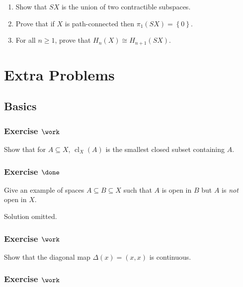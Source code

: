 \begin{enumerate}
\def\labelenumi{\alph{enumi}.}
\item
  Show that \(SX\) is the union of two contractible subspaces.
\item
  Prove that if \(X\) is path-connected then
  \(\pi_1 (SX) = \left\{{0}\right\}\).
\item
  For all \(n \geq 1\), prove that \(H_{n} (X) \cong H_{n+1} (SX)\).
\end{enumerate}

\hypertarget{extra-problems}{%
\section{Extra Problems}\label{extra-problems}}

\hypertarget{basics}{%
\subsection{Basics}\label{basics}}

\hypertarget{exercise-work}{%
\subsubsection{\texorpdfstring{Exercise
\(\work\)}{Exercise \textbackslash work}}\label{exercise-work}}

Show that for \(A\subseteq X\), \({ \operatorname{cl}} _X(A)\) is the
smallest closed subset containing \(A\).

\hypertarget{exercise-done}{%
\subsubsection{\texorpdfstring{Exercise
\(\done\)}{Exercise \textbackslash done}}\label{exercise-done}}

Give an example of spaces \(A\subseteq B \subseteq X\) such that \(A\)
is open in \(B\) but \(A\) is \emph{not} open in \(X\).

Solution omitted.

\hypertarget{exercise-work-1}{%
\subsubsection{\texorpdfstring{Exercise
\(\work\)}{Exercise \textbackslash work}}\label{exercise-work-1}}

Show that the diagonal map \(\Delta(x) = (x, x)\) is continuous.

\hypertarget{exercise-work-2}{%
\subsubsection{\texorpdfstring{Exercise
\(\work\)}{Exercise \textbackslash work}}\label{exercise-work-2}}

